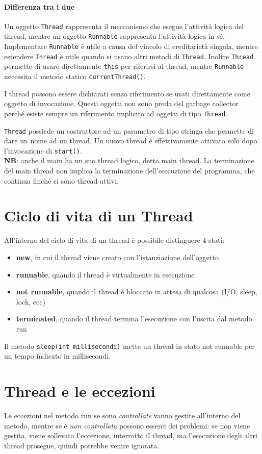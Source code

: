 \paragraph{Differenza tra i due} Un oggetto \texttt{Thread} rappresenta il meccanismo che esegue l'attività logica del thread, mentre un oggetto \texttt{Runnable} rappresenta l'attività logica in sé.
Implementare \texttt{Runnable} è utile a causa del vincolo di ereditarietà singola, mentre estendere \texttt{Thread} è utile quando si usano altri metodi di \texttt{Thread}. Inoltre \texttt{Thread} permette di usare direttamente \texttt{this} per riferirsi al thread, mentre \texttt{Runnable} necessita il metodo statico \texttt{currentThread()}.

I thread possono essere dichiarati senza riferimento se usati direttamente come oggetto di invocazione. Questi oggetti non sono preda del garbage collector perché esiste sempre un riferimento implicito ad oggetti di tipo \texttt{Thread}.

\texttt{Thread} possiede un costruttore ad un parametro di tipo stringa che permette di dare un nome ad un thread. Un nuovo thread è effettivamente attivato solo dopo l'invocazione di \texttt{start()}. \\
\textbf{NB}: anche il main ha un suo thread logico, detto main thread. La terminazione del main thread non implica la terminazione dell'esecuzione del programma, che continua finché ci sono thread attivi.


\section{Ciclo di vita di un Thread}
All'interno del ciclo di vita di un thread è possibile distinguere 4 stati:
\begin{itemize}
\item \textbf{new}, in cui il thread viene creato con l'istanziazione dell'oggetto
\item \textbf{runnable}, quando il thread è virtualmente in esecuzione
\item \textbf{not runnable}, quando il thread è bloccato in attesa di qualcosa (I/O, sleep, lock, ecc)
\item \textbf{terminated}, quando il thread termina l'esecuzione con l'uscita dal metodo run
\end{itemize}
Il metodo \texttt{sleep(int millisecondi)} mette un thread in stato not runnable per un tempo indicato in millisecondi.

\section{Thread e le eccezioni}
Le eccezioni nel metodo run se sono \textit{controllate} vanno gestite all'interno del metodo, mentre se è \textit{non controllata} possono esserci dei problemi: se non viene gestita, viene sollevata l'eccezione, interrotto il thread, ma l'esecuzione degli altri thread prosegue, quindi potrebbe venire ignorata. 

